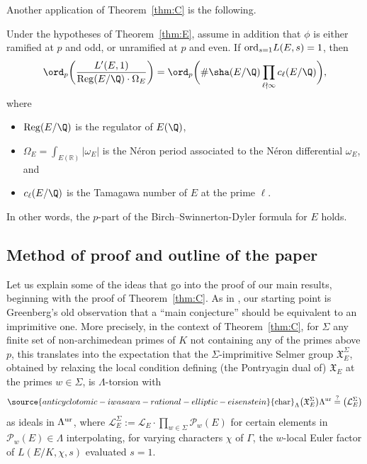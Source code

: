 Another application of Theorem~\ref{thm:C} is the following.
\begin{theorem}
\notready\label{thm:F}
Under the hypotheses of Theorem~\ref{thm:E}, assume in addition that $\phi$ is either ramified at $p$ and odd, or unramified at $p$ and even. If ${\rm ord}_{s=1}L(E,s)=1$, then
\[
\ord_{p}\biggl(\frac{L'(E, 1)}{\operatorname{Reg}(E / \Q) \cdot \Omega_{E}}\biggr)=\ord_{p}\biggl(\# \sha(E / \Q) \prod_{\ell \nmid \infty} c_{\ell}(E /\Q)\biggr),
\]
where
\begin{itemize}
\item ${\rm Reg}(E/\Q)$ is the regulator of $E(\Q)$,
\item $\Omega_E=\int_{E(\mathbb{R})}\vert\omega_E\vert$ is the N\'{e}ron  period associated to the N\'{e}ron differential $\omega_E$, and
\item $c_\ell(E/\Q)$ is the Tamagawa number of $E$ at the prime $\ell$.
\end{itemize}
In other words, the $p$-part of the Birch--Swinnerton-Dyler formula for $E$ holds.
\end{theorem}


\subsection{Method of proof and outline of the paper}

Let us explain some of the ideas that go into the  proof of our main results, beginning with the proof of Theorem~\ref{thm:C}. As in \cite{greenvats}, our starting point is Greenberg's old observation \cite{greenberg-nagoya} that a ``main conjecture'' should be equivalent to an imprimitive one. More precisely, in the context of Theorem~\ref{thm:C}, for $\Sigma$ any finite set of non-archimedean primes of $K$ not containing any of the primes above $p$, this translates into the expectation that the $\Sigma$-imprimitive Selmer group $\mathfrak{X}_E^\Sigma$, obtained by relaxing the local condition defining (the Pontryagin dual of) $\mathfrak{X}_E$ at the primes $w\in\Sigma$, is $\Lambda$-torsion with
\begin{equation}\label{eq:BDP-imp}
\source{anticyclotomic-iwasawa-rational-elliptic-eisenstein}
{\rm char}_\Lambda\bigl(\mathfrak{X}_E^\Sigma\bigr)\Lambda^{\rm ur}\overset{?}=\bigl(\mathcal{L}_E^\Sigma\bigr)
\end{equation}
as ideals in $\Lambda^{\rm ur}$, where $\mathcal{L}_E^\Sigma:=\mathcal{L}_E\cdot\prod_{w\in\Sigma}\mathcal{P}_w(E)$ for certain elements in $\mathcal{P}_w(E)\in\Lambda$ interpolating, for varying characters $\chi$ of $\Gamma$, the $w$-local Euler factor of $L(E/K,\chi,s)$ evaluated $s=1$.

